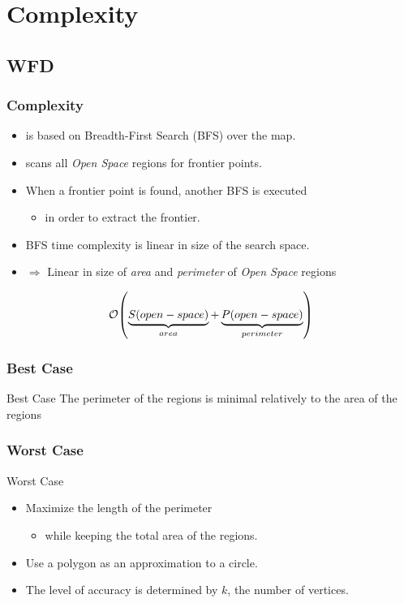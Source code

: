 \section{Complexity}
\subsection*{WFD}

\begin{frame}
\frametitle{\WFD Complexity}
\begin{itemize}
  \item \WFD is based on Breadth-First Search (BFS) over the map.
  \item \WFD scans all \emph{Open Space} regions for frontier points.
  \item When a frontier point is found, another BFS is executed
  	\begin{itemize}
  	  \item in order to extract the frontier.
  	\end{itemize}
  \item BFS time complexity is linear in size of the search space.
  \item $\Rightarrow$ Linear in size of \emph{area} and \emph{perimeter} of
  \emph{Open Space} regions
\end{itemize}

$$
\mathcal{O}{\left(\underbrace{S{\left(open-space\right)}}_{area} +
\underbrace{P{\left(open-space\right)}}_{perimeter}\right)}
$$

\end{frame}

\begin{frame}
\frametitle{\WFD Best Case}
\begin{block}{Best Case}
The perimeter of the \openspace regions is minimal relatively to
the area of the \openspace regions
\end{block}
\begin{figure}
  \centering
  
	\label{fig:wfd_best_case}
\end{figure}
\end{frame}



\begin{frame}
\frametitle{\WFD Worst Case}
\begin{block}{Worst Case}
\begin{itemize}
  \item Maximize the length of the perimeter 
  	\begin{itemize}
  	  \item while \alert{keeping} the total area of the \openspace regions.
  	\end{itemize}
  \item Use a polygon as an approximation to a circle.
  \item The level of accuracy is determined by $k$, the number
of vertices.
\end{itemize}

\end{block}
\end{frame}




